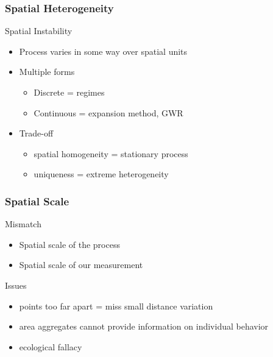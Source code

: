 \documentclass[nototal]{beamer}
\begin{document}
\begin{frame}
  \frametitle{Spatial Heterogeneity}
  \begin{block}{Spatial Instability}
    \begin{itemize}
      \item Process varies in some way over spatial units
      \item Multiple forms
	\begin{itemize}
	  \item Discrete = regimes
	  \item Continuous = expansion method, GWR
	\end{itemize}
      \item Trade-off
	\begin{itemize}
	  \item spatial homogeneity = stationary process
	  \item uniqueness = extreme heterogeneity
	\end{itemize}
    \end{itemize}
   \end{block}
 \end{frame}

 \begin{frame}
   \frametitle{Spatial Scale}
   \begin{block}{Mismatch}
     \begin{itemize}
       \item Spatial scale of the process
       \item Spatial scale of our measurement
     \end{itemize}
    \end{block}
\begin{block}{Issues}
     \begin{itemize}
       \item points too far apart = miss small distance variation
       \item area aggregates cannot provide information on individual
	 behavior
       \item ecological fallacy
     \end{itemize}
    \end{block}

  \end{frame}
 
\end{document}
